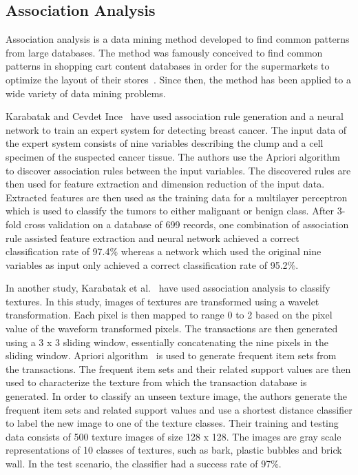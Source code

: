 \subsection{Association Analysis}

Association analysis is a data mining method developed to find common patterns from large databases. The method was famously conceived to find common patterns in shopping cart content databases in order for the supermarkets to optimize the layout of their stores~\cite{Agrawal:1993:MAR:170036.170072}. Since then, the method has been applied to a wide variety of data mining problems.

Karabatak and Cevdet Ince~\cite{KARABATAK20093465} have used association rule generation and a neural network to train an expert system for detecting breast cancer. The input data of the expert system consists of nine variables describing the clump and a cell specimen of the suspected cancer tissue. The authors use the Apriori algorithm~\cite{Agrawal94fastalgorithms} to discover association rules between the input variables. The discovered rules are then used for feature extraction and dimension reduction of the input data. Extracted features are then used as the training data for a multilayer perceptron which is used to classify the tumors to either malignant or benign class. After 3-fold cross validation on a database of 699 records, one combination of association rule assisted feature extraction and neural network achieved a correct classification rate of 97.4\% whereas a network which used the original nine variables as input only achieved a correct classification rate of 95.2\%.

In another study, Karabatak et al.~\cite{KARABATAK201132} have used association analysis to classify textures. In this study, images of textures are transformed using a wavelet transformation. Each pixel is then mapped to range 0 to 2 based on the pixel value of the waveform transformed pixels. The transactions are then generated using a 3 x 3 sliding window, essentially concatenating the nine pixels in the sliding window. Apriori algorithm~\cite{Agrawal94fastalgorithms} is used to generate frequent item sets from the transactions. The frequent item sets and their related support values are then used to characterize the texture from which the transaction database is generated. In order to classify an unseen texture image, the authors generate the frequent item sets and related support values and use a shortest distance classifier to label the new image to one of the texture classes. Their training and testing data consists of 500 texture images of size 128 x 128. The images are gray scale representations of 10 classes of textures, such as bark, plastic bubbles and brick wall. In the test scenario, the classifier had a success rate of 97\%. 